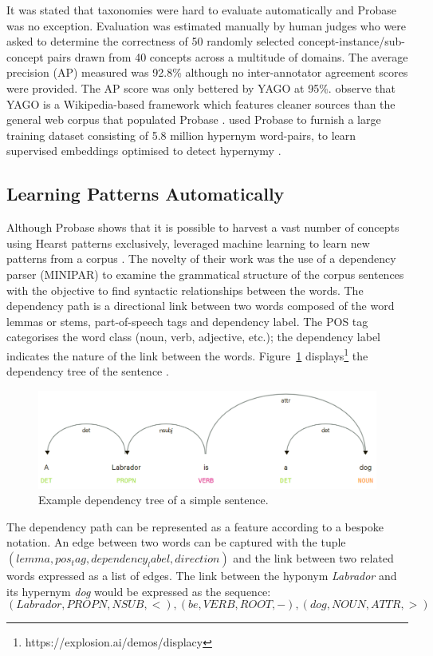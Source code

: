 It was stated that taxonomies were hard to evaluate automatically \citep{camacho2017we} and Probase was no exception.  Evaluation was estimated manually by human judges who were asked to determine the correctness of 50 randomly selected concept-instance/sub-concept pairs drawn from 40 concepts across a multitude of domains.  The average precision (AP) measured was 92.8\% although no inter-annotator agreement scores were provided.  The AP score was only bettered by YAGO \citep{suchanek2007yago} at 95\%.  \citeauthor{wu2012probase} observe that YAGO is a Wikipedia-based framework which features cleaner sources than the general web corpus that populated Probase \citep{wu2012probase}.  \citeauthor{yu2015learning} used Probase to furnish a large training dataset consisting of 5.8 million hypernym word-pairs, to learn supervised embeddings optimised to detect hypernymy \citep{yu2015learning}.

\subsection{Learning Patterns Automatically} \label{Learning Patterns Automatically}
Although Probase shows that it is possible to harvest a vast number of concepts using Hearst patterns \citep{hearst1992automatic} exclusively, \citeauthor{Snow2004} leveraged machine learning to learn new patterns from a corpus \citep{Snow2004}.  The novelty of their work was the use of a dependency parser (MINIPAR) to examine the grammatical structure of the corpus sentences with the objective to find syntactic relationships between the words.  The dependency path is a directional link between two words composed of the word lemmas or stems, part-of-speech tags and dependency label.  The \ac{POS} tag categorises the word class (noun, verb, adjective, etc.); the dependency label indicates the nature of the link between the words.  Figure~\ref{fig:simple_dep_tree} displays\footnote{https://explosion.ai/demos/displacy} the dependency tree of the sentence .
\begin{figure}[ht!] %
  \centering
  \includegraphics[width=1.\linewidth]{images/dependency_parse.png}
  \caption{Example dependency tree of a simple sentence.}%
  \label{fig:simple_dep_tree}
\end{figure}
The dependency path can be represented as a feature according to a bespoke notation.  An edge between two words can be captured with the tuple $(lemma, pos_tag, dependency_label, direction)$ and the link between two related words expressed as a list of edges.  The link between the hyponym \textit{Labrador} and its hypernym \textit{dog} would be expressed as the sequence:
\[(Labrador, PROPN, NSUB, <), (be, VERB, ROOT, -),(dog, NOUN, ATTR, >)\]

